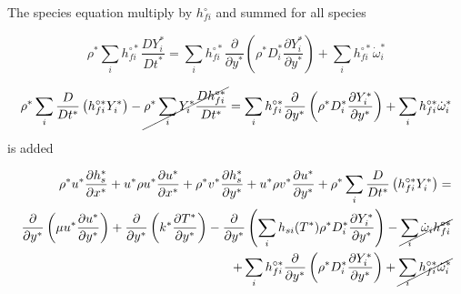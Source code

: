 The species equation multiply by $h_{fi}^{\circ}$ and summed 
for all species 

\begin{equation}
    \rho^*
    \sum_i  
    h_{fi}^{\circ*}
    \frac{D Y_i^*}{D t^*}
    =
    \sum_i  
    h_{fi}^{\circ*}
    \frac{\partial }{\partial y^*}
    \left(
        \rho^*D_i^*
        \frac{\partial Y_i^* }{\partial y^*}
    \right)
    +
    \sum_i
    h_{fi}^{\circ*}
    \dot{\omega}_i^{*}
\end{equation}

\begin{equation}
    \rho^*
    \sum_i  
    \frac{D }{D t^*}
    \left(
        h_{fi}^{\circ*}
        Y_i^*
    \right)
    - 
    \cancel{
    \rho^*
    \sum_i  
    Y_i^*
    \frac{D h_{fi}^{\circ*}}{D t^*}
    }
    =
    \sum_i  
    h_{fi}^{\circ*}
    \frac{\partial }{\partial y^*}
    \left(
        \rho^*D_i^*
        \frac{\partial Y_i^* }{\partial y^*}
    \right)
    +
    \sum_i
    h_{fi}^{\circ*}
    \dot{\omega}_i^{*}
\end{equation}

is added 

\begin{equation}
\begin{split}
\rho^* u^* \frac{\partial h_s^*}{\partial x^*}
+
u^*
\rho u^*\frac{\partial u^*}{\partial x^*}
+
\rho^* v^* \frac{\partial h_s^*}{\partial y^*}
+
u^*
\rho v^*\frac{\partial u^*}{\partial y^*}
+
\rho^*
\sum_i  
\frac{D }{D t^*}
\left(
    h_{fi}^{\circ*}
    Y_i^*
\right)
=
\\
\frac{\partial}{\partial y^*}
\left(
    \mu
    u^*
    \frac{\partial u^*}{\partial y^*}
\right)
+
\frac{\partial}{\partial y^*}
\left(
    k^*\frac{\partial T^*}{\partial y^*}
\right)
-
\frac{\partial}{\partial y^*}
\left(
        \sum_i
        h_{si}(T^*)
        \rho^* 
        D_i^*
        \frac{\partial Y_i^*}{\partial y^*}
\right)
-
\cancel{
\sum_i  
\dot{\omega}_i
h_{fi}^{\circ*}
}
\\
+
\sum_i  
h_{fi}^{\circ*}
\frac{\partial }{\partial y^*}
\left(
    \rho^*D_i^*
    \frac{\partial Y_i^* }{\partial y^*}
\right)
+
\cancel{
\sum_i
h_{fi}^{\circ*}
\dot{\omega}_i^{*}
}
\end{split}
\end{equation} 

